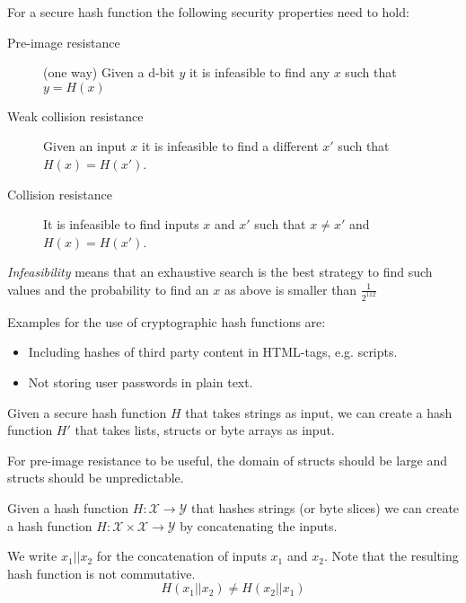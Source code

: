 


\begin{definition}
	For a secure hash function the following security properties need to hold:
	\begin{description}
		\item[Pre-image resistance] (one way) Given a d-bit $y$ it is infeasible to find any $x$ such that $y= H(x)$
		\item[Weak collision resistance] Given an input $x$ it is infeasible to find a different $x'$ such that $H(x) = H(x')$.
		\item[Collision resistance] It is infeasible to find inputs $x$ and $x'$
		such that $x \neq x'$ and $H(x)=H(x')$.
	\end{description}
	\emph{Infeasibility} means that an exhaustive search is the best strategy to find such values and the probability to find an $x$ as above is smaller than $\frac{1}{2^{112}}$
\end{definition}


\begin{example}
Examples for the use of cryptographic hash functions are:
\begin{itemize}
	\item Including hashes of third party content in HTML-tags, e.g. scripts.
	\item Not storing user passwords in plain text.
\end{itemize}
\end{example}


\begin{note}
Given a secure hash function $H$ that takes strings as input, we can create a hash function $H'$ that takes lists, structs or byte arrays as input.

For pre-image resistance to be useful, the domain of structs should be large and structs should be unpredictable.
\end{note}



\begin{note}
Given a hash function $H: \mathcal{X} \rightarrow \mathcal{Y}$ that hashes strings (or byte slices) we can create a hash function $H: \mathcal{X} \times \mathcal{X} \rightarrow \mathcal{Y}$ by concatenating the inputs.

We write $x_1|| x_2$ for the concatenation of inputs $x_1$ and $x_2$.
Note that the resulting hash function is not commutative.
\[
H(x_1||x_2) \neq H(x_2|| x_1)
\]
\end{note}

